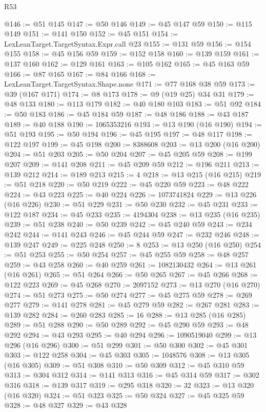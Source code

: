 \begin{lexlean}{R53}
\begin{coremodule}
@146 := @51 @145
@147 := @50 @146
@149 := @45 @147 @59
@150 := @115 @149
@151 := @141 @150
@152 := @45 @151
@154 := LexLeanTarget.TargetSyntax.Expr.call @23
@155 := @131 @59
@156 := @154 @155
@158 := @45 @156 @59
@159 := @152 @158
@160 := @139 @159
@161 := @137 @160
@162 := @129 @161
@163 := @105 @162
@165 := @45 @163 @59
@166 := @87 @165
@167 := @84 @166
@168 := LexLeanTarget.TargetSyntax.Shape.none
@171 := @77 @168 @38 @59
@173 := @39 (@167 @171)
@174 := @8 @173
@178 := @9 (@19 @25) @34 @31
@179 := @48 @133
@180 := @113 @179
@182 := @40 @180 @103
@183 := @51 @92
@184 := @50 @183
@186 := @45 @184 @59
@187 := @48 @186
@188 := @43 @187
@189 := @40 @188
@190 := 1065353216
@193 := @13 @190 (@16 @190)
@194 := @51 @193
@195 := @50 @194
@196 := @45 @195
@197 := @48 @117
@198 := @122 @197
@199 := @45 @198
@200 := 8388608
@203 := @13 @200 (@16 @200)
@204 := @51 @203
@205 := @50 @204
@207 := @45 @205 @59
@208 := @199 @207
@209 := @141 @208
@211 := @45 @209 @59
@212 := @196 @211
@213 := @139 @212
@214 := @189 @213
@215 := 4
@218 := @13 @215 (@16 @215)
@219 := @51 @218
@220 := @50 @219
@222 := @45 @220 @59
@223 := @48 @222
@224 := @43 @223
@225 := @40 @224
@226 := 1073741824
@229 := @13 @226 (@16 @226)
@230 := @51 @229
@231 := @50 @230
@232 := @45 @231
@233 := @122 @187
@234 := @45 @233
@235 := 4194304
@238 := @13 @235 (@16 @235)
@239 := @51 @238
@240 := @50 @239
@242 := @45 @240 @59
@243 := @234 @242
@244 := @141 @243
@246 := @45 @244 @59
@247 := @232 @246
@248 := @139 @247
@249 := @225 @248
@250 := 8
@253 := @13 @250 (@16 @250)
@254 := @51 @253
@255 := @50 @254
@257 := @45 @255 @59
@258 := @48 @257
@259 := @43 @258
@260 := @40 @259
@261 := 1082130432
@264 := @13 @261 (@16 @261)
@265 := @51 @264
@266 := @50 @265
@267 := @45 @266
@268 := @122 @223
@269 := @45 @268
@270 := 2097152
@273 := @13 @270 (@16 @270)
@274 := @51 @273
@275 := @50 @274
@277 := @45 @275 @59
@278 := @269 @277
@279 := @141 @278
@281 := @45 @279 @59
@282 := @267 @281
@283 := @139 @282
@284 := @260 @283
@285 := 16
@288 := @13 @285 (@16 @285)
@289 := @51 @288
@290 := @50 @289
@292 := @45 @290 @59
@293 := @48 @292
@294 := @43 @293
@295 := @40 @294
@296 := 1090519040
@299 := @13 @296 (@16 @296)
@300 := @51 @299
@301 := @50 @300
@302 := @45 @301
@303 := @122 @258
@304 := @45 @303
@305 := 1048576
@308 := @13 @305 (@16 @305)
@309 := @51 @308
@310 := @50 @309
@312 := @45 @310 @59
@313 := @304 @312
@314 := @141 @313
@316 := @45 @314 @59
@317 := @302 @316
@318 := @139 @317
@319 := @295 @318
@320 := 32
@323 := @13 @320 (@16 @320)
@324 := @51 @323
@325 := @50 @324
@327 := @45 @325 @59
@328 := @48 @327
@329 := @43 @328

\end{coremodule}
\end{lexlean}

